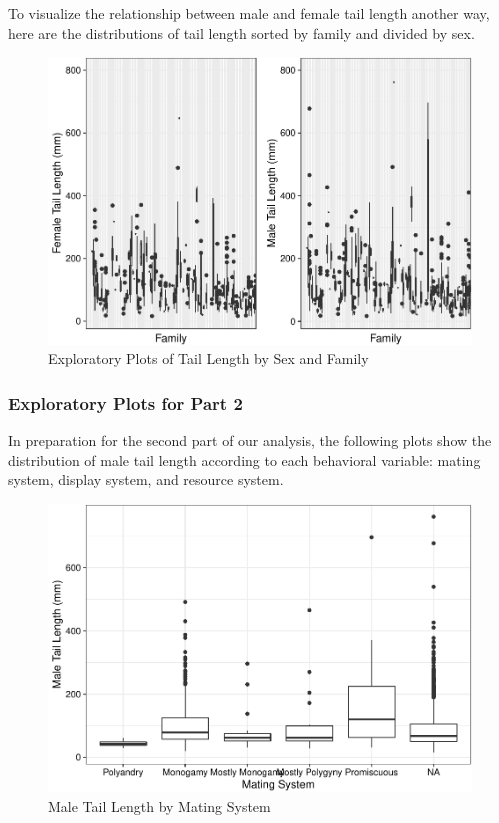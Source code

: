 \documentclass[
  12pt,
]{article}
\begin{document}
\newpage

To visualize the relationship between male and female tail length
another way, here are the distributions of tail length sorted by family
and divided by sex.

\begin{figure}
\centering
\includegraphics{Project_Code_files/figure-latex/r exploratory_plots_1-1.pdf}
\caption{Exploratory Plots of Tail Length by Sex and Family}
\end{figure}

\hypertarget{exploratory-plots-for-part-2}{%
\subsubsection{Exploratory Plots for Part
2}\label{exploratory-plots-for-part-2}}

In preparation for the second part of our analysis, the following plots
show the distribution of male tail length according to each behavioral
variable: mating system, display system, and resource system.

\begin{figure}
\centering
\includegraphics{Project_Code_files/figure-latex/r exploratory_plots_4-1.pdf}
\caption{Male Tail Length by Mating System}
\end{figure}
\end{document}
